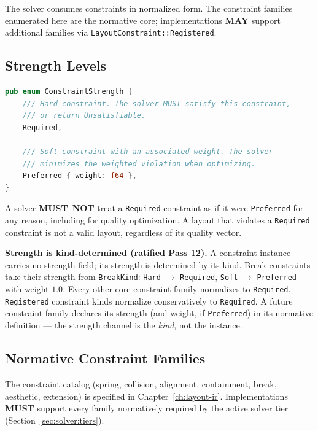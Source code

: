 \documentclass[11pt,letterpaper]{report}
\newcounter{requirement}[chapter]
\newcommand{\MUST}{\textbf{MUST}}
\newcommand{\MUSTNOT}{\textbf{MUST}\nobreak\ \textbf{NOT}}
\newcommand{\MAY}{\textbf{MAY}}
\begin{document}
The solver consumes constraints in normalized form. The constraint
families enumerated here are the normative core; implementations
\MAY{} support additional families via
\texttt{LayoutConstraint::Registered}.

\subsection{Strength Levels}

\begin{lstlisting}[language=Rust]
pub enum ConstraintStrength {
    /// Hard constraint. The solver MUST satisfy this constraint,
    /// or return Unsatisfiable.
    Required,

    /// Soft constraint with an associated weight. The solver
    /// minimizes the weighted violation when optimizing.
    Preferred { weight: f64 },
}
\end{lstlisting}

\begin{requirement}
  \label{req:solver:required-constraint-strength}
  A solver \MUSTNOT{} treat a \texttt{Required} constraint as
  if it were \texttt{Preferred} for any reason, including for
  quality optimization. A layout that violates a \texttt{Required}
  constraint is not a valid layout, regardless of its quality
  vector.
\end{requirement}

\begin{requirement}
  \label{req:solver:kind-strength}
  \textbf{Strength is kind-determined (ratified Pass 12).}
  A constraint instance carries no strength field; its strength is
  determined by its kind. Break constraints take their strength
  from \texttt{BreakKind}: \texttt{Hard} $\to$ \texttt{Required},
  \texttt{Soft} $\to$ \texttt{Preferred} with weight $1.0$. Every
  other core constraint family normalizes to \texttt{Required}.
  \texttt{Registered} constraint kinds normalize conservatively to
  \texttt{Required}. A future constraint family declares its
  strength (and weight, if \texttt{Preferred}) in its normative
  definition --- the strength channel is the \emph{kind}, not the
  instance.
\end{requirement}

\subsection{Normative Constraint Families}

The constraint catalog (spring, collision, alignment, containment,
break, aesthetic, extension) is specified in
Chapter~\ref{ch:layout-ir}. Implementations \MUST{} support every
family normatively required by the active solver tier
(Section~\ref{sec:solver:tiers}).
\end{document}
